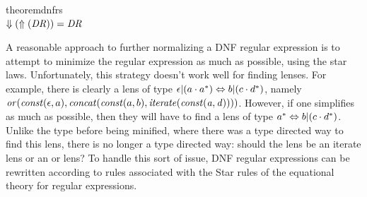 \documentclass[numbers]{sigplanconf}
\begin{document}
\begin{restatable}{theorem}{dnfrs}\leavevmode\\
\label{thm:soundness-dnf-lenses}
$\Downarrow(\Uparrow(\mathit{DR})) = \mathit{DR}$
\end{restatable}

A reasonable approach to further normalizing a DNF regular expression is to attempt to minimize the
regular expression as much as possible, using the star laws.
Unfortunately, this strategy doesn't work
well for finding lenses.  For example, there is clearly a lens of type
$\epsilon|(a\cdot{a}^*) \Leftrightarrow b|(c\cdot{d}^*)$,
namely $\mathit{or}(\mathit{const}(\epsilon,a),\mathit{concat}(\mathit{const}(a,b),\mathit{iterate(\mathit{const}(a,d))}))$.
However, if one simplifies as much as possible, then they will have to find a lens
of type ${a}^* \Leftrightarrow b|(c\cdot{d}^*)$.
Unlike the type before being minified, where there was a type directed way to find
this lens, there is no longer a type directed way: should the lens be an iterate lens
or an or lens?
To handle this sort of issue, DNF regular expressions can be rewritten according
to rules associated with the Star rules of the equational theory for regular
expressions.
\end{document}
